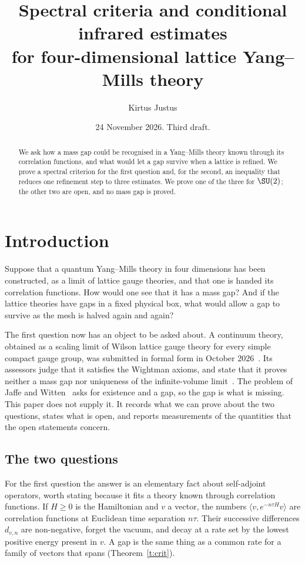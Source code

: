 
\usepackage{tikz}
\usetikzlibrary{positioning,arrows.meta}
\title[Spectral criteria and conditional infrared estimates]{Spectral criteria and conditional infrared estimates\\ for four-dimensional lattice Yang--Mills theory}
\author{Kirtus Justus}
\address{Theoretical Physicist, Port Coquitlam, British Columbia, Canada}
\date{24 November 2026. Third draft.}

\begin{abstract}
We ask how a mass gap could be recognised in a Yang--Mills theory known through its correlation functions,
and what would let a gap survive when a lattice is refined. We prove a spectral criterion for the first
question and, for the second, an inequality that reduces one refinement step to three estimates. We prove one
of the three for $\SU(2)$; the other two are open, and no mass gap is proved.
\end{abstract}
\maketitle
\tableofcontents

\section{Introduction}\label{s:intro}

Suppose that a quantum Yang--Mills theory in four dimensions has been constructed, as a limit of lattice
gauge theories, and that one is handed its correlation functions. How would one see that it has a mass gap?
And if the lattice theories have gaps in a fixed physical box, what would allow a gap to survive as the mesh is
halved again and again?

The first question now has an object to be asked about. A continuum theory, obtained as a scaling limit of
Wilson lattice gauge theory for every simple compact gauge group, was submitted in formal form in October
2026~\cite{OAI}. Its assessors judge that it satisfies the Wightman axioms, and state that it proves neither a
mass gap nor uniqueness of the infinite-volume limit~\cite[p.~1]{YMG}. The problem of Jaffe and
Witten~\cite[\S4]{JW} asks for existence and a gap, so the gap is what is missing. This paper does not supply
it. It records what we can prove about the two questions, states what is open, and reports measurements of
the quantities that the open statements concern.

\subsection{The two questions}
For the first question the answer is an elementary fact about self-adjoint operators, worth stating because
it fits a theory known through correlation functions. If $H\ge0$ is the Hamiltonian and $v$ a vector, the
numbers $\langle v,e^{-n\tau H}v\rangle$ are correlation functions at Euclidean time separation $n\tau$. Their
successive differences $d_{v,n}$ are non-negative, forget the vacuum, and decay at a rate set by the lowest
positive energy present in $v$. A gap is the same thing as a common rate for a family of vectors that spans
(Theorem~\ref{t:crit}).

